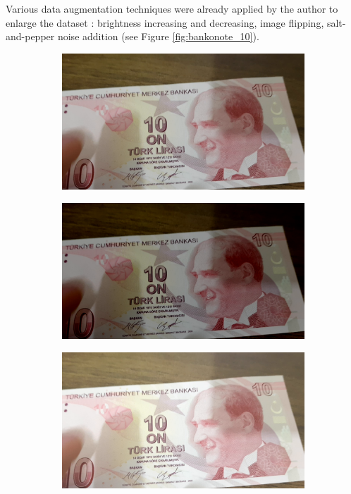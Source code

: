 \documentclass{article}
\begin{document}
\noindent Various data augmentation techniques were already applied by the author to enlarge the dataset \cite{dataset}: brightness increasing and decreasing, image flipping, salt-and-pepper noise addition (see Figure \ref{fig:bankonote_10}).
\begin{figure}[h]
    \centering
    \begin{subfigure}[b]{0.3\textwidth}
        \centering
        \includegraphics[width=\textwidth]{10}
    \end{subfigure}
    \begin{subfigure}[b]{0.3\textwidth}
        \centering
        \includegraphics[width=\textwidth]{10_eminus}
    \end{subfigure}
    \begin{subfigure}[b]{0.3\textwidth}
        \centering
        \includegraphics[width=\textwidth]{10_eplus}
    \end{subfigure}
    

\end{figure}
\end{document}
